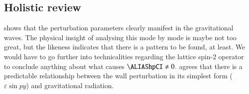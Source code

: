 




\subsection{Holistic review}
    
    
     shows that the perturbation parameters clearly manifest in the gravitational waves. The physical insight of analysing this mode by mode is maybe not too great, but the likeness indicates that there is a pattern to be found, at least. We would have to go further into technicalities regarding the lattice spin-2 operator to conclude anything about what causes $\hpCI\neq 0$. 
     agrees that there is a predictable relationship between the wall perturbation in its simplest form ($\varepsilon \sin{py}$) and gravitational radiation. 


